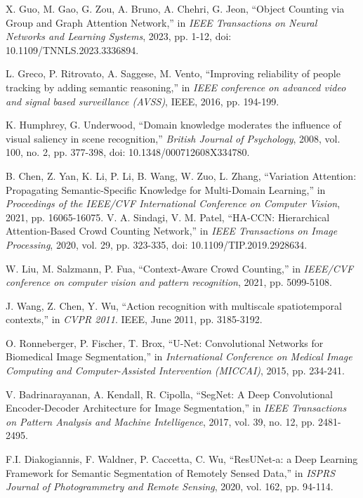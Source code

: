 \documentclass{article}
\begin{document}
\begin{multicols}{2}
\begin{thebibliography}{99}
X. Guo, M. Gao, G. Zou, A. Bruno, A. Chehri, G. Jeon, ``Object Counting via Group and Graph Attention Network,'' in \textit{IEEE Transactions on Neural Networks and Learning Systems}, 2023, pp. 1-12, doi: 10.1109/TNNLS.2023.3336894.

L. Greco, P. Ritrovato, A. Saggese, M. Vento, ``Improving reliability of people tracking by adding semantic reasoning,'' in \textit{IEEE conference on advanced video and signal based surveillance (AVSS)}, IEEE, 2016, pp. 194-199.

K. Humphrey, G. Underwood, ``Domain knowledge moderates the influence of visual saliency in scene recognition,'' \textit{British Journal of Psychology}, 2008, vol. 100, no. 2, pp. 377-398, doi: 10.1348/000712608X334780.

B. Chen, Z. Yan, K. Li, P. Li, B. Wang, W. Zuo, L. Zhang, ``Variation Attention: Propagating Semantic-Specific Knowledge for Multi-Domain Learning,'' in \textit{Proceedings of the IEEE/CVF International Conference on Computer Vision}, 2021, pp. 16065-16075.
V. A. Sindagi, V. M. Patel, ``HA-CCN: Hierarchical Attention-Based Crowd Counting Network,'' in \textit{IEEE Transactions on Image Processing}, 2020, vol. 29, pp. 323-335, doi: 10.1109/TIP.2019.2928634.

W. Liu, M. Salzmann, P. Fua, ``Context-Aware Crowd Counting,'' in \textit{IEEE/CVF conference on computer vision and pattern recognition}, 2021, pp. 5099-5108.

J. Wang, Z. Chen, Y. Wu, ``Action recognition with multiscale spatiotemporal contexts,'' in \textit{CVPR 2011}. IEEE, June 2011, pp. 3185-3192.

O. Ronneberger, P. Fischer, T. Brox, ``U-Net: Convolutional Networks for Biomedical Image Segmentation,'' in \textit{International Conference on Medical Image Computing and Computer-Assisted Intervention (MICCAI)}, 2015, pp. 234-241.

V. Badrinarayanan, A. Kendall, R. Cipolla, ``SegNet: A Deep Convolutional Encoder-Decoder Architecture for Image Segmentation,'' in \textit{IEEE Transactions on Pattern Analysis and Machine Intelligence}, 2017, vol. 39, no. 12, pp. 2481-2495.

F.I. Diakogiannis, F. Waldner, P. Caccetta, C. Wu, ``ResUNet-a: a Deep Learning Framework for Semantic Segmentation of Remotely Sensed Data,'' in \textit{ISPRS Journal of Photogrammetry and Remote Sensing}, 2020, vol. 162, pp. 94-114.


\end{thebibliography}
\end{multicols}
\end{document}
